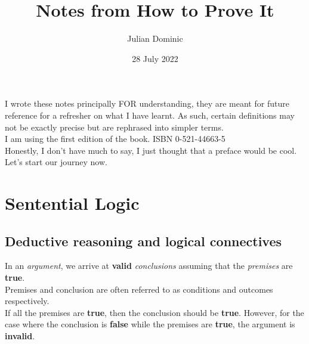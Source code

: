 \documentclass[../setup.tex]{subfiles}
\begin{document}
\title{Notes from How to Prove It}
\author{Julian Dominic}
\date{28 July 2022}
\maketitle
\clearpage

\newcommand{\prefacename}{Preface}
\newenvironment{preface}{
    {\noindent \bfseries \Huge \prefacename}
    \begin{center}
        \thispagestyle{plain}
    \end{center}%
}


\preface
I wrote these notes principally FOR understanding, they are meant for future reference for a refresher on what I have learnt. As such, certain definitions may not be exactly precise but are rephrased into simpler terms. \\
I am using the first edition of the book. ISBN 0-521-44663-5 \\
Honestly, I don't have much to say, I just thought that a preface would be cool. Let's start our journey now.



\tableofcontents
{}
\clearpage

\setcounter{page}{1}



\section{Sentential Logic}
\subsection{Deductive reasoning and logical connectives}
In an \textit{argument}, we arrive at \textbf{valid} \textit{conclusions} assuming that the \textit{premises} are \textbf{true}. \\ 
Premises and conclusion are often referred to as conditions and outcomes respectively. \\
If all the premises are \textbf{true}, then the conclusion should be \textbf{true}. However, for the case where the conclusion is \textbf{false} while the premises are \textbf{true}, the argument is \textbf{invalid}.
\end{document}
